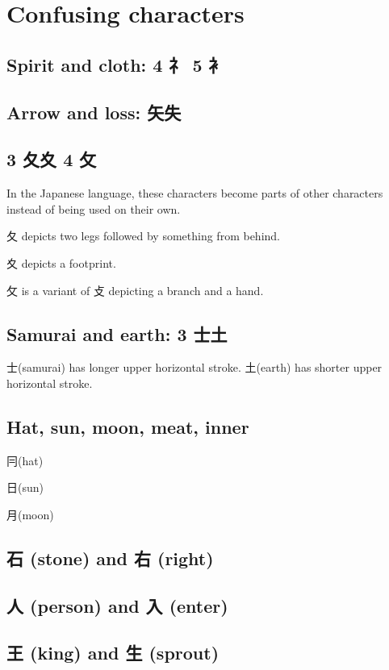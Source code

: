 \section{Confusing characters}

\subsection{Spirit and cloth: 4 礻 5 衤}

\subsection{Arrow and loss: 矢失}

\subsection{3 夂夊 4 攵}

In the Japanese language,
these characters become parts of other characters
instead of being used on their own.

夂 depicts two legs followed by something from behind.

夊 depicts a footprint.

攵 is a variant of 攴 depicting a branch and a hand.

\subsection{Samurai and earth: 3 士土}

士(samurai) has longer upper horizontal stroke.
土(earth) has shorter upper horizontal stroke.

\subsection{Hat, sun, moon, meat, inner}

冃(hat)

日(sun)

月(moon)

\subsection{石 (stone) and 右 (right)}

\subsection{人 (person) and 入 (enter)}

\subsection{王 (king) and 生 (sprout)}

